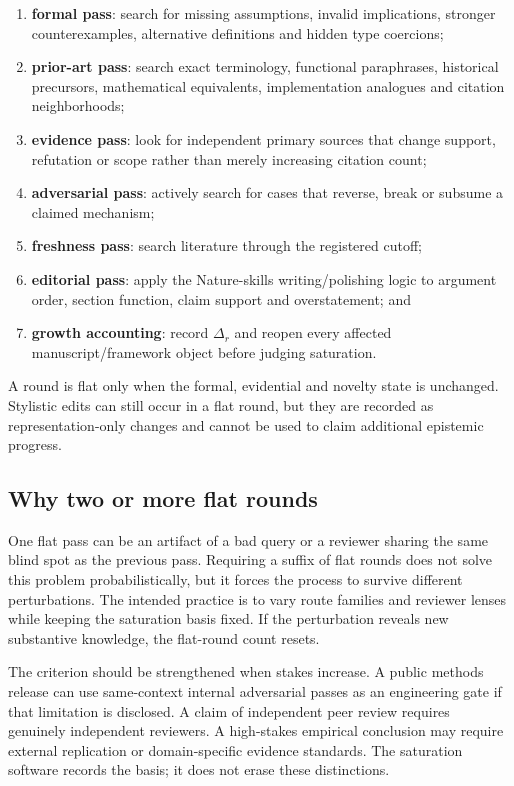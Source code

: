 \documentclass[11pt]{article}
\begin{document}
\begin{enumerate}[leftmargin=*]
\item \textbf{formal pass}: search for missing assumptions, invalid implications, stronger counterexamples, alternative definitions and hidden type coercions;
\item \textbf{prior-art pass}: search exact terminology, functional paraphrases, historical precursors, mathematical equivalents, implementation analogues and citation neighborhoods;
\item \textbf{evidence pass}: look for independent primary sources that change support, refutation or scope rather than merely increasing citation count;
\item \textbf{adversarial pass}: actively search for cases that reverse, break or subsume a claimed mechanism;
\item \textbf{freshness pass}: search literature through the registered cutoff;
\item \textbf{editorial pass}: apply the Nature-skills writing/polishing logic to argument order, section function, claim support and overstatement; and
\item \textbf{growth accounting}: record \(\Delta_r\) and reopen every affected manuscript/framework object before judging saturation.
\end{enumerate}

A round is flat only when the formal, evidential and novelty state is unchanged. Stylistic edits can still occur in a flat round, but they are recorded as representation-only changes and cannot be used to claim additional epistemic progress.

\subsection{Why two or more flat rounds}

One flat pass can be an artifact of a bad query or a reviewer sharing the same blind spot as the previous pass. Requiring a suffix of flat rounds does not solve this problem probabilistically, but it forces the process to survive different perturbations. The intended practice is to vary route families and reviewer lenses while keeping the saturation basis fixed. If the perturbation reveals new substantive knowledge, the flat-round count resets.

The criterion should be strengthened when stakes increase. A public methods release can use same-context internal adversarial passes as an engineering gate if that limitation is disclosed. A claim of independent peer review requires genuinely independent reviewers. A high-stakes empirical conclusion may require external replication or domain-specific evidence standards. The saturation software records the basis; it does not erase these distinctions.
\end{document}
